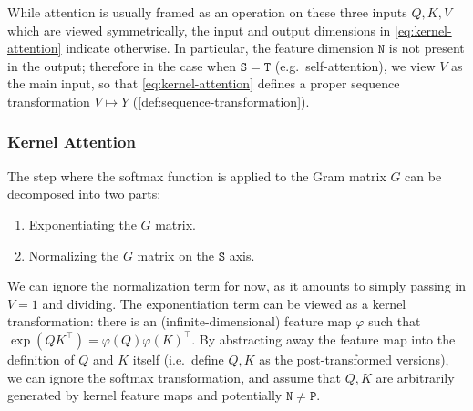 \begin{remark}
  \label{rmk:attention-input}
  While attention is usually framed as an operation on these three inputs $Q, K, V$ which are viewed symmetrically,
  the input and output dimensions in \eqref{eq:kernel-attention} indicate otherwise.
  In particular, the feature dimension $\mathtt{N}$ is not present in the output;
  therefore in the case when $\mathtt{S}=\mathtt{T}$ (e.g.\ self-attention),
  we view $V$ as the main input, so that \eqref{eq:kernel-attention} defines a proper sequence transformation $V \mapsto Y$ (\cref{def:sequence-transformation}).
\end{remark}

\subsubsection{Kernel Attention}
\label{sec:attention:kernel}

The step where the softmax function is applied to the Gram matrix $G$ can be decomposed into two parts:
\begin{enumerate}
  \item Exponentiating the $G$ matrix.
  \item Normalizing the $G$ matrix on the $\mathtt{S}$ axis.
\end{enumerate}
We can ignore the normalization term for now, as it amounts to simply passing in $V=1$ and dividing\iftoggle{arxiv}{ (we revisit this in \cref{sec:architecture:kernels})}{}.
The exponentiation term can be viewed as a kernel transformation:
there is an (infinite-dimensional) feature map $\varphi$ such that $\exp(QK^{\top}) = \varphi(Q)\varphi(K)^{\top}$.
By abstracting away the feature map into the definition of $Q$ and $K$ itself (i.e.\ define $Q, K$ as the post-transformed versions),
we can ignore the softmax transformation, and assume that $Q, K$ are arbitrarily generated by kernel feature maps and potentially $\mathtt{N} \neq \mathtt{P}$.

